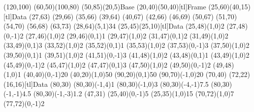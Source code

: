 \documentclass[twoside,11pt]{starlink}
\begin{document}
\clearpage

\newpage

\scriptsize
\begin{terminalv}
\begin{center}
  \begin{picture}(120,100)
    \put(60,50){\oval(100,80)}
    \put(50,85){\makebox(20,5){Base}}
    \put(20,40){\framebox(50,40)[tl]{Frame}}
    \put(25,60){\framebox(40,15)[tl]{Data}}
    \put(27,63){}
    \put(29,66){}
    \put(35,66){}
    \put(39,64){}
    \put(40,67){}
    \put(42,66){}
    \put(46,69){}
    \put(50,67){}
    \put(51,70){}
    \put(54,70){}
    \put(56,68){}
    \put(63,73){}
    \put(28,64){\line(5,1){34}}
    \put(25,45){\framebox(25,10)[tl]{Data}}
    \put(25,48){\line(1,0){2}}
    \put(27,48){\line(0,-1){2}}
    \put(27,46){\line(1,0){2}}
    \put(29,46){\line(0,1){1}}
    \put(29,47){\line(1,0){2}}
    \put(31,47){\line(0,1){2}}
    \put(31,49){\line(1,0){2}}
    \put(33,49){\line(0,1){3}}
    \put(33,52){\line(1,0){2}}
    \put(35,52){\line(0,1){1}}
    \put(35,53){\line(1,0){2}}
    \put(37,53){\line(0,-1){3}}
    \put(37,50){\line(1,0){2}}
    \put(39,50){\line(0,1){1}}
    \put(39,51){\line(1,0){2}}
    \put(41,51){\line(0,-1){3}}
    \put(41,48){\line(1,0){2}}
    \put(43,48){\line(0,1){1}}
    \put(43,49){\line(1,0){2}}
    \put(45,49){\line(0,-1){2}}
    \put(45,47){\line(1,0){2}}
    \put(47,47){\line(0,1){3}}
    \put(47,50){\line(1,0){2}}
    \put(49,50){\line(0,-1){2}}
    \put(49,48){\line(1,0){1}}
    \put(40,40){\line(0,-1){20}}
    \put(40,20){\line(1,0){50}}
    \put(90,20){\line(0,1){50}}
    \put(90,70){\line(-1,0){20}}
    \put(70,40){}
    \put(72,22){\framebox(16,16)[tl]{Data}}
    \put(80,30){}
    \put(80,30){\vector(-1,4){1}}
    \put(80,30){\vector(-1,0){3}}
    \put(80,30){\vector(-4,-1){7.5}}
    \put(80,30){\vector(-1,-1){4.5}}
    \put(80,30){\vector(-1,-3){1.2}}
    \put(47,31){}
    \put(25,40){\line(0,-1){5}}
    \put(25,35){\line(1,0){15}}
    \put(70,72){\line(1,0){7}}
    \put(77,72){\line(0,-1){2}}
  \end{picture}
\end{center}
\end{terminalv}
\end{document}

